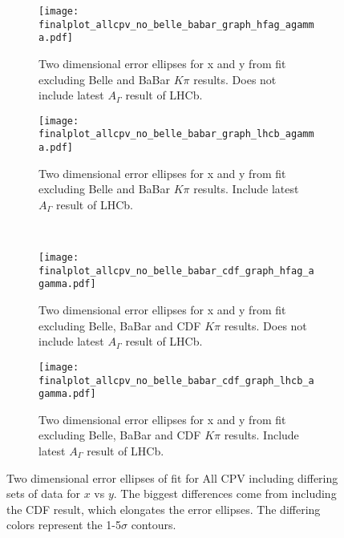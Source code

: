 
\begin{figure}[htb]
  \begin{center}
    \begin{subfigure}[b]{0.4\textwidth}
      \centering
      \texttt{[image: finalplot\_allcpv\_no\_belle\_babar\_graph\_hfag\_agamma.pdf]}
      \caption{Two dimensional error ellipses for x and y from fit excluding Belle and BaBar $K\pi$ results. Does not include latest $A_\Gamma$ result of LHCb.}
      \label{fig:xy_all_cpv_no_agamma}
    \end{subfigure}%
    \hspace{2mm}
    \begin{subfigure}[b]{0.4\textwidth}
      \centering
      \texttt{[image: finalplot\_allcpv\_no\_belle\_babar\_graph\_lhcb\_agamma.pdf]}
      \caption{Two dimensional error ellipses for x and y from fit excluding Belle and BaBar $K\pi$ results. Include latest $A_\Gamma$ result of LHCb.}
      \label{fig:xy_all_cpv_with_agamma}
    \end{subfigure}%
    \\
    \begin{subfigure}[b]{0.4\textwidth}
      \centering
      \texttt{[image: finalplot\_allcpv\_no\_belle\_babar\_cdf\_graph\_hfag\_agamma.pdf]}
      \caption{Two dimensional error ellipses for x and y from fit excluding Belle, BaBar and CDF $K\pi$ results. Does not include latest $A_\Gamma$ result of LHCb.}
      \label{fig:xy_all_cpv_no_agamma}
    \end{subfigure}%
    \hspace{2mm}
    \begin{subfigure}[b]{0.4\textwidth}
      \centering
      \texttt{[image: finalplot\_allcpv\_no\_belle\_babar\_cdf\_graph\_lhcb\_agamma.pdf]}
      \caption{Two dimensional error ellipses for x and y from fit excluding Belle, BaBar and CDF $K\pi$ results. Include latest $A_\Gamma$ result of LHCb.}
      \label{fig:xy_all_cpv_with_agamma}
    \end{subfigure}%
  \end{center}
  \caption{Two dimensional error ellipses of fit for All CPV including differing sets of data for $x$ vs $y$. The biggest differences come from including the CDF result, which elongates the error ellipses. The differing colors represent the 1-5$\sigma$ contours.}
  \label{fig:xy_all_variations}
\end{figure}

